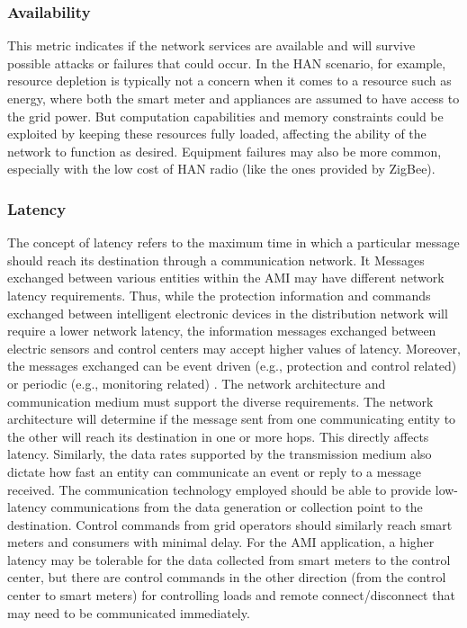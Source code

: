 \documentclass[11pt,draftclsnofoot,onecolumn]{IEEEtran}
\begin{document}
\subsubsection{Availability}

 This metric indicates if the network services are available and will survive possible attacks or failures that could occur. In the HAN scenario, for example, resource depletion is typically not a concern when it comes to a resource such as energy, where both the smart meter and appliances are assumed to have access to the grid power. But computation capabilities and memory constraints could be exploited by keeping these resources fully loaded, affecting the ability of the network to function as desired. Equipment failures may also be more common, especially with the low cost of HAN radio (like the ones provided by ZigBee).

\subsubsection{Latency}
The concept of latency refers to the maximum time in which a particular message should reach its destination through a communication network. It Messages exchanged between various entities within the AMI may have different network latency requirements. Thus, while the protection information and commands exchanged between intelligent electronic devices in the distribution network will require a lower network latency, the information messages exchanged between electric sensors and control centers may accept higher values of latency.  Moreover, the messages exchanged can be event driven (e.g., protection and control related) or periodic (e.g., monitoring related) \cite{Winter2012}. The network architecture and communication medium must support the diverse requirements. The network architecture will determine if the message sent from one communicating entity to the other will reach its destination in one or more hops. This directly affects latency. Similarly, the data rates supported by the transmission medium also dictate how fast an entity can communicate an event or reply to a message received.  The communication technology employed should be able to provide low-latency communications from the data generation or collection point to the destination. Control commands from grid operators should similarly reach smart meters and consumers with minimal delay. For the AMI application, a higher latency may be tolerable for the data collected from smart meters to the control center, but there are control commands in the other direction (from the control center to smart meters) for controlling loads and remote connect/disconnect that may need to be communicated immediately.
\end{document}
